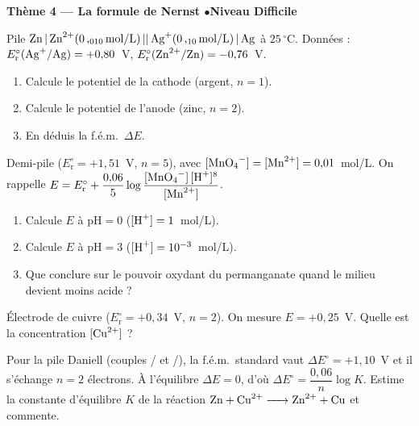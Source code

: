 \documentclass[11pt,a4paper]{article}
\begin{document}
\begin{center}\color{primarydark}\large\bfseries Thème 4 — La formule de Nernst \quad$\bullet$\quad Niveau Difficile\end{center}

\begin{exo}
Pile $\ce{Zn | Zn^{2+}(0{,}010\,mol/L) || Ag+(0{,}10\,mol/L) | Ag}$ à $25\,^{\circ}$C. Données :
$E_{\mathrm{r}}^{\circ}(\ce{Ag+}/\ce{Ag})=+0{,}80$~V, $E_{\mathrm{r}}^{\circ}(\ce{Zn^{2+}}/\ce{Zn})
=-0{,}76$~V.
\begin{enumerate}[label=\alph*)]
  \item Calcule le potentiel de la cathode (argent, $n=1$).
  \item Calcule le potentiel de l'anode (zinc, $n=2$).
  \item En déduis la f.é.m.\ $\Delta E$.
\end{enumerate}
\end{exo}

\begin{exo}
Demi-pile  ($E_{\mathrm{r}}^{\circ}=+1{,}51$~V, $n=5$),
avec $[\ce{MnO4^-}]=[\ce{Mn^{2+}}]=0{,}01$~mol/L. On rappelle
$E=E_{\mathrm{r}}^{\circ}+\dfrac{0{,}06}{5}\log\dfrac{[\ce{MnO4^-}]\,[\ce{H+}]^{8}}{[\ce{Mn^{2+}}]}$.
\begin{enumerate}[label=\alph*)]
  \item Calcule $E$ à $\mathrm{pH}=0$ ($[\ce{H+}]=1$~mol/L).
  \item Calcule $E$ à $\mathrm{pH}=3$ ($[\ce{H+}]=10^{-3}$~mol/L).
  \item Que conclure sur le pouvoir oxydant du permanganate quand le milieu devient moins acide ?
\end{enumerate}
\end{exo}

\begin{exo}
Électrode de cuivre  ($E_{\mathrm{r}}^{\circ}=+0{,}34$~V, $n=2$). On mesure
$E=+0{,}25$~V. Quelle est la concentration $[\ce{Cu^{2+}}]$ ?
\end{exo}

\begin{exo}
Pour la pile Daniell (couples / et /), la f.é.m.\ standard vaut
$\Delta E^{\circ}=+1{,}10$~V et il s'échange $n=2$ électrons. À l'équilibre $\Delta E=0$, d'où
$\Delta E^{\circ}=\dfrac{0{,}06}{n}\log K$. Estime la constante d'équilibre $K$ de la réaction
$\ce{Zn + Cu^{2+} -> Zn^{2+} + Cu}$ et commente.
\end{exo}
\end{document}
